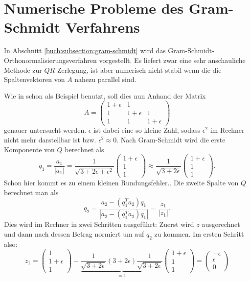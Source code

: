 %
%
%
\section{Numerische Probleme des Gram-Schmidt Verfahrens
\label{qr:section:problemstellung}}
In Abschnitt \ref{buch:subsection:gram-schmidt} wird das Gram-Schmidt-Orthonormalisierungsverfahren vorgestellt.
Es liefert zwar eine sehr anschauliche Methode zur $QR$-Zerlegung, ist aber numerisch nicht stabil wenn die die Spaltenvektoren von $A$ nahezu parallel sind.

Wie in \cite{qr:tam} schon als Beispiel benutzt, soll dies nun Anhand der Matrix
\begin{equation*}
A=\begin{pmatrix}
1+\epsilon&1&\\
1&1+\epsilon&1\\
1&1&1+\epsilon
\end{pmatrix}
\end{equation*}
genauer untersucht werden.
$\epsilon$ ist dabei eine so \glqq kleine\grqq{} Zahl, sodass $\epsilon^2$ im Rechner nicht mehr darstellbar ist bzw. $\epsilon^2\approx0$.
Nach Gram-Schmidt wird die erste Komponente von $Q$ berechnet als
\begin{equation*}
q_1=\frac{a_1}{|a_1|}=\frac{1}{\sqrt{3+2\epsilon+\epsilon^2}}
\begin{pmatrix}
1+\epsilon\\
1\\
1
\end{pmatrix}\approx\frac{1}{\sqrt{3+2\epsilon}}
\begin{pmatrix}
1+\epsilon\\
1\\
1
\end{pmatrix}.
\end{equation*}
Schon hier kommt es zu einem kleinen Rundungsfehler..
Die zweite Spalte von $Q$ berechnet man als
\begin{equation*}
q_2=\frac{a_2-(q_1^Ta_2)q_1}{|a_2-(q_1^Ta_2)q_1|}=\frac{z_1}{|z_1|}.
\end{equation*} 
Dies wird im Rechner in zwei Schritten ausgeführt: Zuerst wird $z$ ausgerechnet und dann nach dessen Betrag normiert um auf $q_2$ zu kommen.
Im ersten Schritt also:
\begin{equation*}
z_1=
\begin{pmatrix}
1\\
1+\epsilon\\
1
\end{pmatrix}-\underbrace{\frac{1}{\sqrt{3+2\epsilon}}(3+2\epsilon)\frac{1}{\sqrt{3+2\epsilon}}}_{=1}
\begin{pmatrix}
1+\epsilon\\
1\\
1
\end{pmatrix}=
\begin{pmatrix}
-\epsilon\\
\epsilon\\
0
\end{pmatrix}
\end{equation*}
